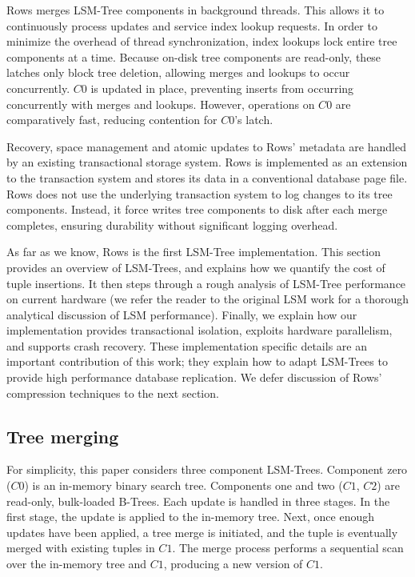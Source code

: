 \documentclass{sig-alternate-sigmod08}
\newcommand{\rows}{Rows\xspace}
\newcommand{\rowss}{Rows'\xspace}
\begin{document}
\rows merges LSM-Tree components in background threads.  This allows
it to continuously process updates and service index lookup requests.
In order to minimize the overhead of thread synchronization, index
lookups lock entire tree components at a time.  Because on-disk tree
components are read-only, these latches only block tree deletion,
allowing merges and lookups to occur concurrently.  $C0$ is
updated in place, preventing inserts from occurring concurrently with
merges and lookups.  However, operations on $C0$ are comparatively
fast, reducing contention for $C0$'s latch.

Recovery, space management and atomic updates to \rowss metadata are
handled by an existing transactional storage system.  \rows is
implemented as an extension to the transaction system and stores its
data in a conventional database page file.  \rows does not use the
underlying transaction system to log changes to its tree components.
Instead, it force writes tree components to disk after each merge completes, ensuring
durability without significant logging overhead.

As far as we know, \rows is the first LSM-Tree implementation.  This
section provides an overview of LSM-Trees, and explains how we
quantify the cost of tuple insertions.  It then steps through a rough
analysis of LSM-Tree performance on current hardware (we refer the
reader to the original LSM work for a thorough analytical discussion
of LSM performance).  Finally, we explain how our implementation
provides transactional isolation, exploits hardware parallelism, and
supports crash recovery.  These implementation specific details are an
important contribution of this work; they explain how to adapt
LSM-Trees to provide high performance database replication.  We defer
discussion of \rowss compression techniques to the next section.

\subsection{Tree merging}


For simplicity,
this paper considers three component LSM-Trees.  Component zero ($C0$)
is an in-memory binary search tree.  Components one and two ($C1$,
$C2$) are read-only, bulk-loaded B-Trees.  
Each update is handled in three stages.  In the first stage, the
update is applied to the in-memory tree.  Next, once enough updates
have been applied, a tree merge is initiated, and the tuple is
eventually merged with existing tuples in $C1$.  The merge process
performs a sequential scan over the in-memory tree and $C1$, producing
a new version of $C1$.
\end{document}

